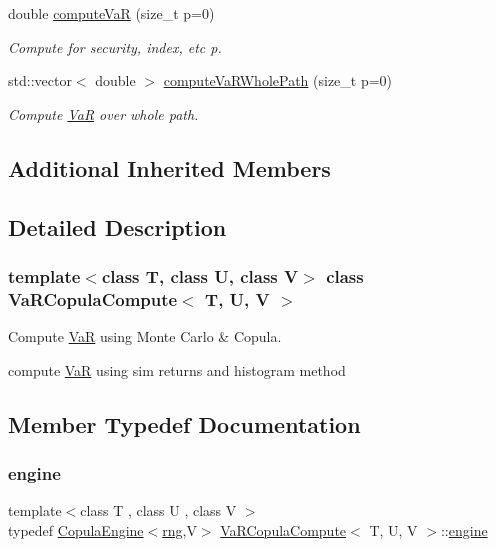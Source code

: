 \begin{DoxyCompactItemize}
double \hyperlink{classVaRCopulaCompute_a5f2a4f1eab16cd600683309d49800e89}{compute\+VaR} (size\+\_\+t p=0)
\begin{DoxyCompactList}\small\item\em Compute for security, index, etc p. \end{DoxyCompactList}\item 
std\+::vector$<$ double $>$ \hyperlink{classVaRCopulaCompute_a6c2501fcfd848a07a91859f2bcdc6516}{compute\+Va\+R\+Whole\+Path} (size\+\_\+t p=0)
\begin{DoxyCompactList}\small\item\em Compute \hyperlink{classVaR}{VaR} over whole path. \end{DoxyCompactList}\end{DoxyCompactItemize}
\subsection*{Additional Inherited Members}


\subsection{Detailed Description}
\subsubsection*{template$<$class T, class U, class V$>$\newline
class Va\+R\+Copula\+Compute$<$ T, U, V $>$}

Compute \hyperlink{classVaR}{VaR} using Monte Carlo \& Copula. 

compute \hyperlink{classVaR}{VaR} using sim returns and histogram method 

\subsection{Member Typedef Documentation}
\hypertarget{classVaRCopulaCompute_a72e41ad9fcb5880aac35affa027f2e3d}{}\label{classVaRCopulaCompute_a72e41ad9fcb5880aac35affa027f2e3d} 
\subsubsection{\texorpdfstring{engine}{engine}}
{\footnotesize\ttfamily template$<$class T , class U , class V $>$ \\
typedef \hyperlink{classCopulaEngine}{Copula\+Engine}$<$\hyperlink{classrng}{rng},V$>$ \hyperlink{classVaRCopulaCompute}{Va\+R\+Copula\+Compute}$<$ T, U, V $>$\+::\hyperlink{classVaRCopulaCompute_a72e41ad9fcb5880aac35affa027f2e3d}{engine}}



